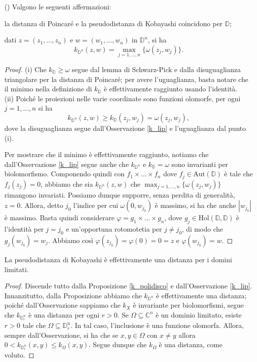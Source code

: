 \begin{prop} \label{k_polidisco}
    (\cite[Chapter 2, Paragraph 2.3, Proposition 2.3.4 and Corollary 2.3.7]{A1}) Valgono le seguenti affermazioni:
    \begin{nlist}
        \item la distanza di Poincaré e la pseudodistanza di Kobayashi coincidono per $\mathbb{D}$;
        \item dati $z=(z_1,\dots,z_n)$ e $w=(w_1,\dots,w_n)$ in $\mathbb{D}^n$, si ha
        $$k_{\mathbb{D}^n}(z,w)=\max_{j=1,\dots,n}\{\omega(z_j,w_j)\}.$$
    \end{nlist}
\end{prop}
\begin{proof}
    (i) Che $k_{\mathbb{D}}\ge\omega$ segue dal lemma di Schwarz-Pick e dalla disuguaglianza triangolare per la distanza di Poincaré; per avere l'uguaglianza, basta notare che il minimo nella definizione di $k_{\mathbb{D}}$ è effettivamente raggiunto usando l'identità.\\

    (ii) Poiché le proiezioni nelle varie coordinate sono funzioni olomorfe, per ogni $j=1,\dots, n$ si ha
    $$k_{\mathbb{D}^n}(z,w) \ge k_{\mathbb{D}}(z_j,w_j)=\omega(z_j,w_j),$$
    dove la disuguaglianza segue dall'Osservazione \ref{k_lip} e l'uguaglianza dal punto (i).

    Per mostrare che il minimo è effettivamente raggiunto, notiamo che dall'Osservazione \ref{k_lip} segue anche che $k_{\mathbb{D}^n}$ e $k_{\mathbb{D}}=\omega$ sono invarianti per biolomorfismo. Componendo quindi con $f_1\times\dots\times f_n$ dove $f_j \in \text{Aut}(\mathbb{D})$ è tale che $f_j(z_j)=0$, abbiamo che sia $k_{\mathbb{D}^n}(z,w)$ che $\displaystyle\max_{j=1,\dots,n}\{\omega(z_j,w_j)\}$ rimangono invariati. Possiamo dunque supporre, senza perdita di generalità, $z=0$. Allora, detto $j_0$ l'indice per cui $\omega(0,w_{j_0})$ è massimo, si ha che anche $|w_{j_0}|$ è massimo. Basta quindi considerare $\varphi=g_1\times\dots\times g_n$, dove $g_j \in\text{Hol}(\mathbb{D},\mathbb{D})$ è l'identità per $j=j_0$ e un'opportuna rotomotetia per $j\not=j_0$, di modo che $g_j(w_{j_0})=w_j$. Abbiamo così $\varphi(z_{j_0})=\varphi(0)=0=z$ e $\varphi(w_{j_0})=w$.
\end{proof}

\begin{cor}
    La pseudodistanza di Kobayashi è effettivamente una distanza per i domini limitati.
\end{cor}
\begin{proof}
    Discende tutto dalla Proposizione \ref{k_polidisco} e dall'Osservazione \ref{k_lip}. Innanzitutto, dalla Proposizione abbiamo che $k_{\mathbb{D}^n}$ è effettivamente una distanza; poiché dall'Osservazione sappiamo che $k_X$ è invariante per biolomorfismi, segue che $k_{\mathbb{D}_r^n}$ è una distanza per ogni $r>0$. Se $\Omega\subseteq\mathbb{C}^n$ è un dominio limitato, esiste $r>0$ tale che $\Omega\subseteq\mathbb{D}_r^n$. In tal caso, l'inclusione è una funzione olomorfa. Allora, sempre dall'Osservazione, si ha che se $x,y \in \Omega$ con $x\not=y$ allora $0<k_{\mathbb{D}_r^n}(x,y) \le k_{\Omega}(x,y)$. Segue dunque che $k_\Omega$ è una distanza, come voluto.
\end{proof}

